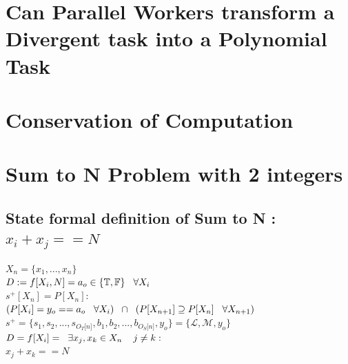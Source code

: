 \documentclass[11pt]{article}
\begin{document}
\section{Can Parallel Workers transform a Divergent task into a Polynomial Task}


\section{Conservation of Computation}









\newpage
\section{Sum to N Problem with 2 integers}
\subsection{State formal definition of Sum to N : $x_i + x_j == N$}
\begin{center}
\vspace{1.5mm}
$
X_n= \{x_1,...,x_n\}
$
\\ \vspace{6mm}
$
D := f \lbrack X_i,N \rbrack = a_{o} \in \{\mathbb{T}, \mathbb{F}\} \hspace{3mm} \forall X_i
$
\\ \vspace{6mm}
$
s^+[X_n]= P[X_n] :
$
\\ \vspace{2mm}
$
(P \lbrack X_i \rbrack = y_{o} == a_{o} \hspace{3mm} \forall X_i) \hspace{2mm} \cap \hspace{2mm} (P[{X}_{n+1}] \supseteq P[X_n] \hspace{3mm} \forall X_{n+1})
$
\\ \vspace{6mm}
$
s^+ = \{ s_1,s_2,...,s_{O_T \lbrack n \rbrack }, b_1, b_2,...,b_{O_S \lbrack n \rbrack},y_o \} = \{ \mathcal{L},\mathcal{M},y_o\}
$
\\ \vspace{6mm}
$
D = f[X_i] = \hspace{2mm} \exists x_j,x_k \in X_n \hspace{4mm} j\neq k: 
$
\\ \vspace{2mm}
$
x_j + x_k == N
$
\end{center}
\end{document}
